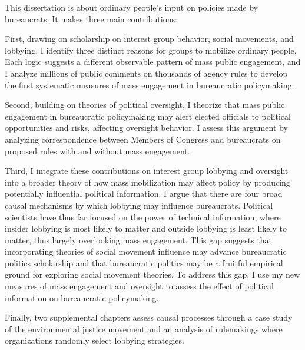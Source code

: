 This dissertation is about ordinary people's input on policies made by bureaucrats. 
It makes three main contributions:

First, drawing on scholarship on interest group behavior, social movements, and lobbying, I identify three distinct reasons for groups to mobilize ordinary people. Each logic suggests a different observable pattern of mass public engagement, and I analyze millions of public comments on thousands of agency rules to develop the first systematic measures of mass engagement in bureaucratic policymaking. 

Second, building on theories of political oversight, I theorize that mass public engagement in bureaucratic policymaking may alert elected officials to political opportunities and risks, affecting oversight behavior. I assess this argument by analyzing correspondence between Members of Congress and bureaucrats on proposed rules with and without mass engagement.

Third, I integrate these contributions on interest group lobbying and oversight into a broader theory of how mass mobilization may affect policy by producing potentially influential political information. I argue that there are four broad causal mechanisms by which lobbying may influence bureaucrats. Political scientists have thus far focused on the power of technical information, where insider lobbying is most likely to matter and outside lobbying is least likely to matter, thus largely overlooking mass engagement. This gap suggests that incorporating theories of social movement influence may advance bureaucratic politics scholarship and that bureaucratic politics may be a fruitful empirical ground for exploring social movement theories. To address this gap, I use my new measures of mass engagement and oversight to assess the effect of political information on bureaucratic policymaking.

Finally, two supplemental chapters assess causal processes through a case study of the environmental justice movement and an analysis of rulemakings where organizations randomly select lobbying strategies.

